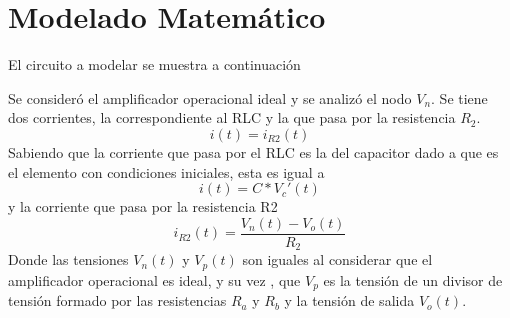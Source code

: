 \documentclass[10pt,a4paper]{article} %
\begin{document}
\section{Modelado Matemático}
El circuito a modelar se muestra a continuación %
\begin{center}
\end{center} 
Se consideró el amplificador operacional ideal y se analizó el nodo $V_{n}$.
Se tiene dos corrientes, la correspondiente al RLC y la que pasa por la resistencia $R_{2}$. \\
\begin{equation}
i(t)=i_{R2}(t)
\end{equation}
Sabiendo que la corriente que pasa por el RLC es la del capacitor dado a que es el elemento con condiciones iniciales, esta es igual a 
\begin{equation}
i(t)=C*V_{c}'(t)
\end{equation}
y la corriente que pasa por la resistencia R2 
\begin{equation}
i_{R2}(t)=\frac{V_{n}(t)-V_{o}(t)}{R_{2}}
\end{equation}
Donde las tensiones $V_{n}(t)$ y $V_{p}(t)$ son iguales al considerar que el amplificador operacional es ideal, y su vez , que  $V_{p}$ es la tensión de un divisor de tensión formado por las resistencias $R_{a}$ y $R_{b}$ y la tensión de salida  $V_{o}(t)$. 
\end{document}
